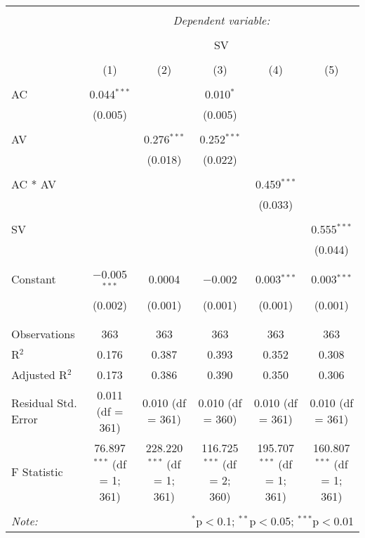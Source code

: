 
\begin{table}[!htbp] \centering 
  \caption{} 
  \label{} 
\begin{tabular}{@{\extracolsep{5pt}}lccccc} 
\\[-1.8ex]\hline 
\hline \\[-1.8ex] 
 & \multicolumn{5}{c}{\textit{Dependent variable:}} \\ 
\cline{2-6} 
\\[-1.8ex] & \multicolumn{5}{c}{SV} \\ 
\\[-1.8ex] & (1) & (2) & (3) & (4) & (5)\\ 
\hline \\[-1.8ex] 
 AC & 0.044$^{***}$ &  & 0.010$^{*}$ &  &  \\ 
  & (0.005) &  & (0.005) &  &  \\ 
  & & & & & \\ 
 AV &  & 0.276$^{***}$ & 0.252$^{***}$ &  &  \\ 
  &  & (0.018) & (0.022) &  &  \\ 
  & & & & & \\ 
 AC * AV &  &  &  & 0.459$^{***}$ &  \\ 
  &  &  &  & (0.033) &  \\ 
  & & & & & \\ 
 SV &  &  &  &  & 0.555$^{***}$ \\ 
  &  &  &  &  & (0.044) \\ 
  & & & & & \\ 
 Constant & $-$0.005$^{***}$ & 0.0004 & $-$0.002 & 0.003$^{***}$ & 0.003$^{***}$ \\ 
  & (0.002) & (0.001) & (0.001) & (0.001) & (0.001) \\ 
  & & & & & \\ 
\hline \\[-1.8ex] 
Observations & 363 & 363 & 363 & 363 & 363 \\ 
R$^{2}$ & 0.176 & 0.387 & 0.393 & 0.352 & 0.308 \\ 
Adjusted R$^{2}$ & 0.173 & 0.386 & 0.390 & 0.350 & 0.306 \\ 
Residual Std. Error & 0.011 (df = 361) & 0.010 (df = 361) & 0.010 (df = 360) & 0.010 (df = 361) & 0.010 (df = 361) \\ 
F Statistic & 76.897$^{***}$ (df = 1; 361) & 228.220$^{***}$ (df = 1; 361) & 116.725$^{***}$ (df = 2; 360) & 195.707$^{***}$ (df = 1; 361) & 160.807$^{***}$ (df = 1; 361) \\ 
\hline 
\hline \\[-1.8ex] 
\textit{Note:}  & \multicolumn{5}{r}{$^{*}$p$<$0.1; $^{**}$p$<$0.05; $^{***}$p$<$0.01} \\ 
\end{tabular} 
\end{table} 
